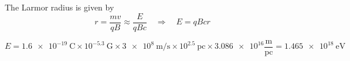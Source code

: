 The Larmor radius is given by
\begin{equation}
  r = \frac{mv}{qB} \approx \frac{E}{qBc}
  \quad \Rightarrow \quad
  E = qBcr
\end{equation}

\begin{equation}
  E = \SI{1.6e-19}{\coulomb} \times
      10^{-5.3}~\mathrm{G} \times
      \SI{3e8}{\meter\per\second} \times
      10^{2.5}~\mathrm{pc} \times
      \num{3.086e16}\mathrm{\frac{m}{pc}}
    = \boxed{ \SI{1.465e18}{\electronvolt} }
\end{equation}
